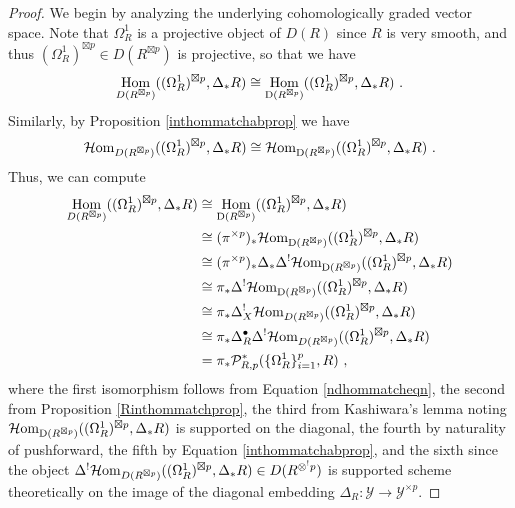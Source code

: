 \documentclass[11pt]{amsart}
\numberwithin{equation}{section}
\theoremstyle{definition}
\newcommand{\mc}{\mathcal}
\DeclareMathOperator{\Hom}{Hom}
\newcommand{\Homi}{{\mc H\textup{om}}}
\newcommand{\0}{{\textbf{0}}}
\newcommand{\Dd}{{\textup{D}}}
\newcommand{\DD}{{D}}
\begin{document}
\begin{proof}
	We begin by analyzing the underlying cohomologically graded vector space. Note that $\Omega^1_R$ is a projective object of $\DD(R)$ since $R$ is very smooth, and thus $(\Omega^1_R)^{\boxtimes p}\in \DD(R^{\boxtimes p})$ is projective, so that we have
\begin{equation}\label{ndhommatcheqn}
		 \Hom_{\DD(R^{\boxtimes p})}((\Omega^1_R)^{\boxtimes p},\Delta_*R) \cong \Hom_{\Dd(R^{\boxtimes p})}((\Omega^1_R)^{\boxtimes p},\Delta_*R) \ .  
\end{equation}
	Similarly, by Proposition \ref{inthommatchabprop} we have
\begin{equation}\label{ndhommatchinteqn}
			 \Homi_{\DD(R^{\boxtimes p})}((\Omega^1_R)^{\boxtimes p},\Delta_*R) \cong \Homi_{\Dd(R^{\boxtimes p})}((\Omega^1_R)^{\boxtimes p},\Delta_*R) \ .  
\end{equation}
	Thus, we can compute
	\begin{align*}
		\Hom_{\DD(R^{\boxtimes p})}((\Omega^1_R)^{\boxtimes p},\Delta_*R) & \cong	\Hom_{\Dd(R^{\boxtimes p})}((\Omega^1_R)^{\boxtimes p},\Delta_*R) \\
		& \cong (\pi^{\times p})_* \Homi_{\Dd(R^{\boxtimes p})}((\Omega^1_R)^{\boxtimes p},\Delta_*R) \\
		& \cong (\pi^{\times p})_* \Delta_* \Delta^!\Homi_{\Dd(R^{\boxtimes p})}((\Omega^1_R)^{\boxtimes p},\Delta_*R) \\
		& \cong\pi_* \Delta^!\Homi_{\Dd(R^{\boxtimes p})}((\Omega^1_R)^{\boxtimes p},\Delta_*R) \\
		& \cong \pi_*\Delta^!_X\Homi_{\DD(R^{\boxtimes p})}((\Omega^1_R)^{\boxtimes p},\Delta_*R) \\
		& \cong \pi_* \Delta_R^{\bullet}\Delta^!\Homi_{\DD(R^{\boxtimes p})}((\Omega^1_R)^{\boxtimes p},\Delta_*R) \\
		& = \pi_* \mc P^*_{R,p}(\{\Omega^1_R\}_{i=1}^p,R) \ , 
	\end{align*}
	where the first isomorphism follows from Equation \ref{ndhommatcheqn}, the second from Proposition \ref{Rinthommatchprop}, the third from Kashiwara's lemma noting $\Homi_{\Dd(R^{\boxtimes p})}((\Omega^1_R)^{\boxtimes p},\Delta_*R)$ is supported on the diagonal, the fourth by naturality of pushforward, the fifth by Equation \ref{inthommatchabprop}, and the sixth since the object $\Delta^!\Homi_{\DD(R^{\boxtimes p})}((\Omega^1_R)^{\boxtimes p},\Delta_*R)\in\DD(R^{\otimes^! p})$ is supported scheme theoretically on the image of the diagonal embedding $\Delta_R:\mc Y \to \mc Y^{\times p}$.
	 

\end{proof}
\end{document}
